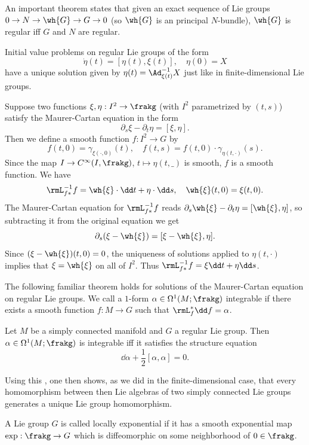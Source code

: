 An important theorem states that given an exact sequence of Lie groups $0\to N\to \wh{G}\to G\to 0$ (so $\wh{G}$ is an principal $N$-bundle), $\wh{G}$ is regular iff $G$ and $N$ are regular.

Initial value problems on regular Lie groups of the form
\[\dot\eta(t)=[\eta(t),\xi(t)],\quad \eta(0)=X\]
have a unique solution given by $\eta(t)=\Ad_{\xi(t)}^{-1
}X$ just like in finite-dimensional Lie groups.


\begin{rem}
    Suppose two functions $\xi,\eta:I^2\to \frakg$ (with $I^2$ parametrized by $(t,s)$) satisfy the Maurer-Cartan equation in the form
    \[\partial_s \xi-\partial_t \eta=[\xi,\eta].\]
    Then we define a smooth function $f:I^2\to G$ by
    \[f(t,0)=\gamma_{\xi(\cdot,0)}(t),\quad f(t,s)=f(t,0)\cdot \gamma_{\eta(t,\cdot)}(s).\]
    Since the map $I\to C^\infty(I,\frakg)$, $t\mapsto \eta(t,\_)$ is smooth, $f$ is a smooth function. We have
    \[\rmL_{f\ast}^{-1}f=\wh{\xi}\cdot \dd t+\eta\cdot \dd s,\quad \wh{\xi}(t,0)=\xi(t,0).\]
    The Maurer-Cartan equation for $\rmL_{f\ast}^{-1}f$ reads $\partial_s \wh{\xi}-\partial_t\eta=[\wh{\xi},\eta]$, so subtracting it from the original equation we get
    \[\partial_s(\xi-\wh{\xi})=[\xi-\wh{\xi},\eta].\]
    Since $(\xi-\wh{\xi})(t,0)=0$, the uniqueness of solutions applied to $\eta(t,\cdot)$ implies that $\xi=\wh{\xi}$ on all of $I^2$. Thus $\rmL_{f\ast}^{-1}f=\xi\dd t+\eta\dd s$.
\end{rem}

The following familiar theorem holds for solutions of the Maurer-Cartan equation on regular Lie groups. We call a $1$-form $\alpha\in\Omega^1(M;\frakg)$ integrable if there exists a smooth function $f:M\to G$ such that $\rmL_f^\ast \dd f=\alpha$.

\begin{thm}
    Let $M$ be a simply connected manifold and $G$ a regular Lie group. Then $\alpha\in\Omega^1(M;\frakg)$ is integrable iff it satisfies the structure equation
    \[\dd\alpha +\frac12[\alpha,\alpha]=0.\]
\end{thm}

Using this , one then shows, as we did in the finite-dimensional case, that every homomorphism between then Lie algebras of two simply connected Lie groups generates a unique Lie group homomorphism.

\begin{defn}
    A Lie group $G$ is called locally exponential if it has a smooth exponential map $\exp:\frakg\to G$ which is diffeomorphic on some neighborhood of $0\in\frakg$.
\end{defn}

